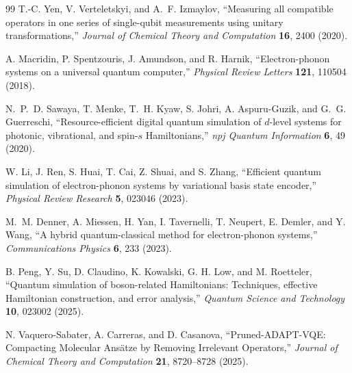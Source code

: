 \documentclass[
  reprint,
  amsmath,
  amssymb,
  aps,
  pra,
  nofootinbib,
  superscriptaddress,
  floatfix
]{revtex4-2}
\begin{document}
\begin{thebibliography}{99}
T.-C. Yen, V. Verteletskyi, and A.~F. Izmaylov,
``Measuring all compatible operators in one series of single-qubit measurements using unitary transformations,''
\emph{Journal of Chemical Theory and Computation} \textbf{16}, 2400 (2020).


A. Macridin, P. Spentzouris, J. Amundson, and R. Harnik,
``Electron-phonon systems on a universal quantum computer,''
\emph{Physical Review Letters} \textbf{121}, 110504 (2018).

N.~P.~D. Sawaya, T. Menke, T.~H. Kyaw, S. Johri, A. Aspuru-Guzik, and G.~G. Guerreschi,
``Resource-efficient digital quantum simulation of $d$-level systems for photonic, vibrational, and spin-$s$ Hamiltonians,''
\emph{npj Quantum Information} \textbf{6}, 49 (2020).

W. Li, J. Ren, S. Huai, T. Cai, Z. Shuai, and S. Zhang,
``Efficient quantum simulation of electron-phonon systems by variational basis state encoder,''
\emph{Physical Review Research} \textbf{5}, 023046 (2023).

M.~M. Denner, A. Miessen, H. Yan, I. Tavernelli, T. Neupert, E. Demler, and Y. Wang,
``A hybrid quantum-classical method for electron-phonon systems,''
\emph{Communications Physics} \textbf{6}, 233 (2023).

B. Peng, Y. Su, D. Claudino, K. Kowalski, G. H. Low, and M. Roetteler,
``Quantum simulation of boson-related Hamiltonians: Techniques, effective Hamiltonian construction, and error analysis,''
\emph{Quantum Science and Technology} \textbf{10}, 023002 (2025).

N. Vaquero-Sabater, A. Carreras, and D. Casanova,
``Pruned-ADAPT-VQE: Compacting Molecular Ans\"atze by Removing Irrelevant Operators,''
\emph{Journal of Chemical Theory and Computation} \textbf{21}, 8720--8728 (2025).

\end{thebibliography}
\end{document}
